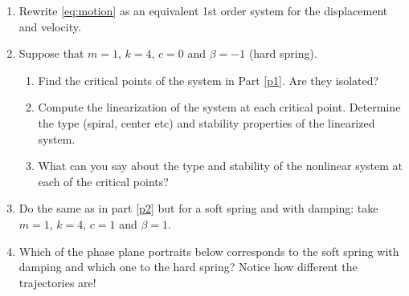 \documentclass[11pt]{article}
\renewcommand{\b}{\beta}
\begin{document}
\begin{enumerate}
	\item \label{p1} Rewrite \eqref{eq:motion} as an equivalent 1st order system for the displacement and velocity.
	\item \label{p2} Suppose that $m=1$, $k=4$, $c=0$ and $\b=-1$ (hard spring). 
	\begin{enumerate}
		\item Find the critical points of the system in Part \ref{p1}. Are they isolated?
		\item Compute the linearization of the system at each critical point. Determine the type (spiral, center etc) and stability properties of the linearized system. 
		\item What can you say about the type and stability of the nonlinear system at each of the critical points?
	\end{enumerate}
	\item Do the same as in part \ref{p2} but for a soft spring and with damping: take $m=1$, $k=4$, $c=1$ and $\b=1$.

	\item Which of the phase plane portraits below corresponds to the soft spring with damping and which one to the hard spring? Notice how different the trajectories are!


\end{enumerate}
\end{document}
